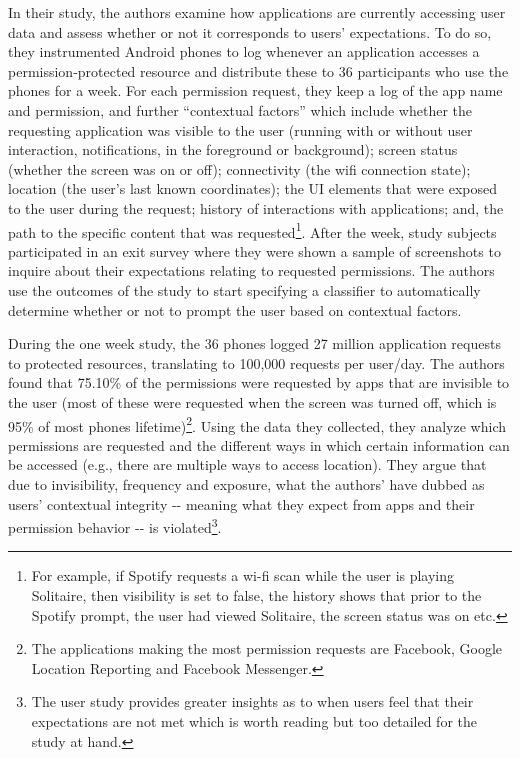 \documentclass[../thesis.tex]{subfiles}
\begin{document}
In their study, the authors examine how applications are currently
accessing user data and assess whether or not it corresponds to
users' expectations. To do so, they instrumented
Android phones to log whenever an application accesses a
permission-protected resource and distribute these to 36 participants
who use the phones for a week. For each permission request, they keep a
log of the app name and permission, and further
``contextual factors'' which include
whether the requesting application was visible to the user (running
with or without user interaction, notifications, in the foreground or
background); screen status (whether the screen was on or off);
connectivity (the wifi connection state); location (the
user's last known coordinates); the UI elements that
were exposed to the user during the request; history of interactions
with applications; and, the path to the specific content that was
requested\footnote{ For example, if Spotify requests a wi-fi scan while
the user is playing Solitaire, then visibility is set to false, the
history shows that prior to the Spotify prompt, the user had viewed
Solitaire, the screen status was on etc.}. After the week, study
subjects participated in an exit survey where they were shown a sample
of screenshots to inquire about their expectations relating to
requested permissions. The authors use the outcomes of the study to
start specifying a classifier to automatically determine whether or not
to prompt the user based on contextual factors.


\bigskip

During the one week study, the 36 phones logged 27 million application
requests to protected resources, translating to 100,000 requests per
user/day. The authors found that 75.10\% of the permissions were
requested by apps that are invisible to the user (most of these were
requested when the screen was turned off, which is 95\% of most phones
lifetime)\footnote{ The applications making the most permission
requests are Facebook, Google Location Reporting and Facebook
Messenger.}. Using the data they collected, they analyze which
permissions are requested and the different ways in which certain
information can be accessed (e.g., there are multiple ways to access
location). They argue that due to invisibility, frequency and exposure,
what the authors' have dubbed as users'
contextual integrity -{}- meaning what they expect from apps and their
permission behavior -{}- is violated\footnote{
\textcolor[rgb]{0.2,0.2,0.2}{The user study provides greater insights
as to when users feel that their expectations are not met which is
worth reading but too detailed for the study at hand.}}. 
\end{document}
